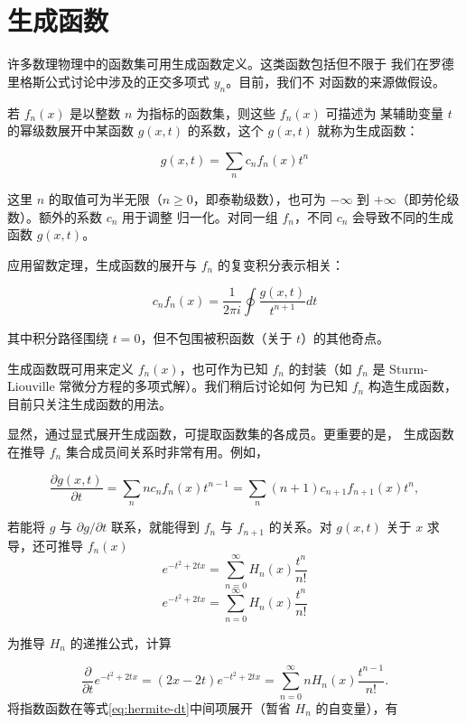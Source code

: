 \section{生成函数}

许多数理物理中的函数集可用生成函数定义。这类函数包括但不限于
我们在罗德里格斯公式讨论中涉及的正交多项式 $y_n$。目前，我们不
对函数的来源做假设。

若 $f_n(x)$ 是以整数 $n$ 为指标的函数集，则这些 $f_n(x)$ 可描述为
某辅助变量 $t$ 的幂级数展开中某函数 $g(x, t)$ 的系数，这个
$g(x, t)$ 就称为生成函数：

$$
g(x, t)=\sum_n c_n f_n(x) t^n
$$

这里 $n$ 的取值可为半无限（$n \geq 0$，即泰勒级数），也可为
$-\infty$ 到 $+\infty$（即劳伦级数）。额外的系数 $c_n$ 用于调整
归一化。对同一组 $f_n$，不同 $c_n$ 会导致不同的生成函数 $g(x, t)$。

应用留数定理，生成函数的展开与 $f_n$ 的复变积分表示相关：

$$
c_n f_n(x)=\frac{1}{2 \pi i} \oint \frac{g(x, t)}{t^{n+1}} d t
$$

其中积分路径围绕 $t=0$，但不包围被积函数（关于 $t$）的其他奇点。

生成函数既可用来定义 $f_n(x)$，也可作为已知 $f_n$ 的封装（如
$f_n$ 是 Sturm-Liouville 常微分方程的多项式解）。我们稍后讨论如何
为已知 $f_n$ 构造生成函数，目前只关注生成函数的用法。

显然，通过显式展开生成函数，可提取函数集的各成员。更重要的是，
生成函数在推导 $f_n$ 集合成员间关系时非常有用。例如，

$$
\frac{\partial g(x, t)}{\partial t}=\sum_n n c_n f_n(x) t^{n-1}=
\sum_n(n+1) c_{n+1} f_{n+1}(x) t^n,
$$

若能将 $g$ 与 $\partial g / \partial t$ 联系，就能得到 $f_n$ 与
$f_{n+1}$ 的关系。对 $g(x, t)$ 关于 $x$ 求导，还可推导 $f_n(x)$
\begin{equation}
e^{-t^2+2 t x}=\sum_{n=0}^{\infty} H_n(x) \frac{t^n}{n!}
\label{eq:hermite-gen}
\end{equation}
$$
e^{-t^2+2 t x}=\sum_{n=0}^{\infty} H_n(x) \frac{t^n}{n!}
$$

为推导 $H_n$ 的递推公式，计算

\begin{equation}
\frac{\partial}{\partial t} e^{-t^2+2 t x}=(2 x-2 t) e^{-t^2+2 t x}=\sum_{n=0}^{\infty} n H_n(x) \frac{t^{n-1}}{n!} .
\label{eq:hermite-dt}
\end{equation}
将指数函数在等式\eqref{eq:hermite-dt}中间项展开（暂省 $H_n$ 的自变量），有

